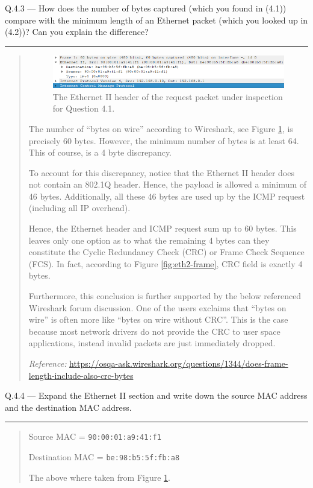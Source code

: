\documentclass{article}
\newcommand\Que[2]{%
   \begin{samepage}
   \leavevmode\par
   \noindent
   Q.#1 --- #2\par\vspace{10pt}\hrule\vspace{10pt}
   \end{samepage}}
\newenvironment{ans}
   {\fbox{Answer}\begin{quote}\nopagebreak}
   {\end{quote}}
\newcommand\Refer[1]{
   \begin{center}
      {\small\textit{Reference:} \url{#1}}
   \end{center}
}%
\begin{document}
\Que{4.3}{How does the number of bytes captured (which you found
in (4.1)) compare with the minimum length of an Ethernet packet
(which you looked up in (4.2))? Can you explain the difference?}

\begin{ans}
\begin{figure}[H]
\centering
\includegraphics[width=14cm]{data/q4.3-ethernet-header.png}
\caption{The Ethernet II header of the request packet under
inspection for Question 4.1.}
\label{fig:eth2-header-for-q4.3}
\end{figure}

The number of ``bytes on wire'' according to Wireshark, see
Figure \ref{fig:eth2-header-for-q4.3}, is precisely 60
bytes. However, the minimum number of bytes is at least 64.
This of course, is a 4 byte discrepancy.

To account for this discrepancy, notice that the Ethernet
II header does not contain an 802.1Q header. Hence, the
payload is allowed a minimum of 46 bytes. Additionally, all
these 46 bytes are used up by the ICMP request (including
all IP overhead).

Hence, the Ethernet header and ICMP request sum up to 60
bytes. This leaves only one option as to what the remaining
4 bytes can they constitute the Cyclic Redundancy Check
(CRC) or Frame Check Sequence (FCS). In fact, according to
Figure \ref{fig:eth2-frame}, CRC field is exactly 4 bytes.

Furthermore, this conclusion is further supported by the
below referenced Wireshark forum discussion. One of the
users exclaims that ``bytes on wire'' is often more like
``bytes on wire without CRC''. This is the case because
most network drivers do not provide the CRC to user space
applications, instead invalid packets are just immediately
dropped.

\Refer{https://osqa-ask.wireshark.org/questions/1344/does-frame-length-include-also-crc-bytes}
\end{ans}

\Que{4.4}{Expand the Ethernet II section and write down the
source MAC address and the destination MAC address.}

\begin{ans}
Source MAC = \texttt{90:00:01:a9:41:f1}

Destination MAC = \texttt{be:98:b5:5f:fb:a8}

The above where taken from Figure
\ref{fig:eth2-header-for-q4.3}.
\end{ans}
\end{document}
